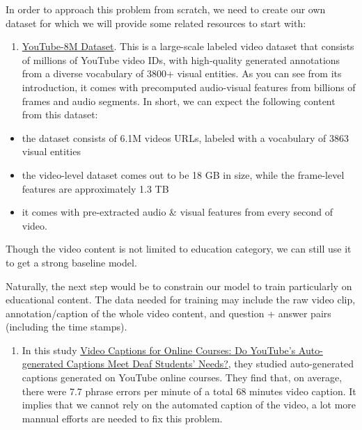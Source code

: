 \documentclass[]{book}
\providecommand{\tightlist}{%
  \setlength{\itemsep}{0pt}\setlength{\parskip}{0pt}}
\theoremstyle{definition}
\theoremstyle{definition}
\theoremstyle{definition}
\theoremstyle{remark}
\begin{document}
In order to approach this problem from scratch, we need to create our
own dataset for which we will provide some related resources to start
with:

\begin{enumerate}
\def\labelenumi{\arabic{enumi}.}
\tightlist
\item
  \href{https://research.google.com/youtube8m/}{YouTube-8M Dataset}.
  This is a large-scale labeled video dataset that consists of millions
  of YouTube video IDs, with high-quality generated annotations from a
  diverse vocabulary of 3800+ visual entities. As you can see from its
  introduction, it comes with precomputed audio-visual features from
  billions of frames and audio segments. In short, we can expect the
  following content from this dataset:
\end{enumerate}

\begin{itemize}
\item
  the dataset consists of 6.1M videos URLs, labeled with a vocabulary of
  3863 visual entities
\item
  the video-level dataset comes out to be 18 GB in size, while the
  frame-level features are approximately 1.3 TB
\item
  it comes with pre-extracted audio \& visual features from every second
  of video.
\end{itemize}

Though the video content is not limited to education category, we can
still use it to get a strong baseline model.

Naturally, the next step would be to constrain our model to train
particularly on educational content. The data needed for training may
include the raw video clip, annotation/caption of the whole video
content, and question + answer pairs (including the time stamps).

\begin{enumerate}
\def\labelenumi{\arabic{enumi}.}
\setcounter{enumi}{1}
\tightlist
\item
  In this study
  \href{http://jofdl.nz/index.php/JOFDL/article/download/255/198}{Video
  Captions for Online Courses: Do YouTube's Auto-generated Captions Meet
  Deaf Students' Needs?}, they studied auto-generated captions generated
  on YouTube online courses. They find that, on average, there were 7.7
  phrase errors per minute of a total 68 minutes video caption. It
  implies that we cannot rely on the automated caption of the video, a
  lot more mannual efforts are needed to fix this problem.
\end{enumerate}
\end{document}
